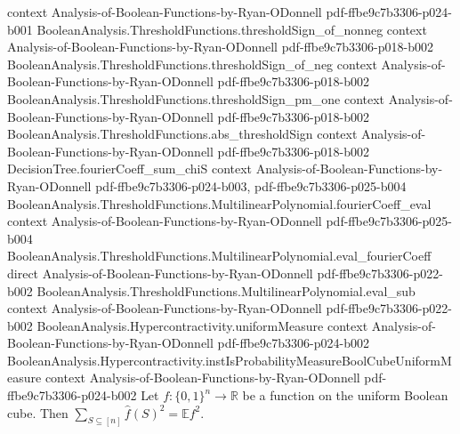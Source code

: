 \begin{lemma}
  {context}
  {Analysis-of-Boolean-Functions-by-Ryan-ODonnell}
  {pdf-ffbe9c7b3306-p024-b001}
\proofstep
  {BooleanAnalysis.ThresholdFunctions.thresholdSign_of_nonneg}
  {context}
  {Analysis-of-Boolean-Functions-by-Ryan-ODonnell}
  {pdf-ffbe9c7b3306-p018-b002}
\proofstep
  {BooleanAnalysis.ThresholdFunctions.thresholdSign_of_neg}
  {context}
  {Analysis-of-Boolean-Functions-by-Ryan-ODonnell}
  {pdf-ffbe9c7b3306-p018-b002}
\proofstep
  {BooleanAnalysis.ThresholdFunctions.thresholdSign_pm_one}
  {context}
  {Analysis-of-Boolean-Functions-by-Ryan-ODonnell}
  {pdf-ffbe9c7b3306-p018-b002}
\proofstep
  {BooleanAnalysis.ThresholdFunctions.abs_thresholdSign}
  {context}
  {Analysis-of-Boolean-Functions-by-Ryan-ODonnell}
  {pdf-ffbe9c7b3306-p018-b002}
\proofstep
  {DecisionTree.fourierCoeff_sum_chiS}
  {context}
  {Analysis-of-Boolean-Functions-by-Ryan-ODonnell}
  {pdf-ffbe9c7b3306-p024-b003,
    pdf-ffbe9c7b3306-p025-b004}
\proofstep
  {BooleanAnalysis.ThresholdFunctions.MultilinearPolynomial.fourierCoeff_eval}
  {context}
  {Analysis-of-Boolean-Functions-by-Ryan-ODonnell}
  {pdf-ffbe9c7b3306-p025-b004}
\proofstep
  {BooleanAnalysis.ThresholdFunctions.MultilinearPolynomial.eval_fourierCoeff}
  {direct}
  {Analysis-of-Boolean-Functions-by-Ryan-ODonnell}
  {pdf-ffbe9c7b3306-p022-b002}
\proofstep
  {BooleanAnalysis.ThresholdFunctions.MultilinearPolynomial.eval_sub}
  {context}
  {Analysis-of-Boolean-Functions-by-Ryan-ODonnell}
  {pdf-ffbe9c7b3306-p022-b002}
\proofstep
  {BooleanAnalysis.Hypercontractivity.uniformMeasure}
  {context}
  {Analysis-of-Boolean-Functions-by-Ryan-ODonnell}
  {pdf-ffbe9c7b3306-p024-b002}
\proofstep
  {BooleanAnalysis.Hypercontractivity.instIsProbabilityMeasureBoolCubeUniformMeasure}
  {context}
  {Analysis-of-Boolean-Functions-by-Ryan-ODonnell}
  {pdf-ffbe9c7b3306-p024-b002}
\label{KKL.sum_fourier_sq_eq_expect_sq}
Let $f:\{0,1\}^n\to\mathbb R$ be a function on the uniform Boolean cube. Then
$\sum_{S\subseteq[n]}\widehat f(S)^2=\mathbb Ef^2$.
\end{lemma}

